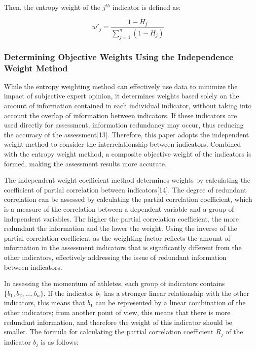 \documentclass[12pt]{article}  %
\begin{document}
Then, the entropy weight of the \(j^{th}\) indicator is defined as:

\begin{equation}
	w'_j=\frac{1-H_j}{\sum_{j=1}^n(1-H_j)}
\end{equation}

\subsubsection{Determining Objective Weights Using the Independence Weight Method}

While the entropy weighting method can effectively use data to minimize the impact of subjective expert opinion, it determines weights based solely on the amount of information contained in each individual indicator, without taking into account the overlap of information between indicators. If these indicators are used directly for assessment, information redundancy may occur, thus reducing the accuracy of the assessment[13]. Therefore, this paper adopts the independent weight method to consider the interrelationship between indicators. Combined with the entropy weight method, a composite objective weight of the indicators is formed, making the assessment results more accurate.

The independent weight coefficient method determines weights by calculating the coefficient of partial correlation between indicators[14]. The degree of redundant correlation can be assessed by calculating the partial correlation coefficient, which is a measure of the correlation between a dependent variable and a group of independent variables. The higher the partial correlation coefficient, the more redundant the information and the lower the weight. Using the inverse of the partial correlation coefficient as the weighting factor reflects the amount of information in the assessment indicators that is significantly different from the other indicators, effectively addressing the issue of redundant information between indicators.

In assessing the momentum of athletes, each group of indicators contains \(\{b_1, b_2, \ldots, b_n\}\). If the indicator \(b_1\) has a stronger linear relationship with the other indicators, this means that \(b_1\) can be represented by a linear combination of the other indicators; from another point of view, this means that there is more redundant information, and therefore the weight of this indicator should be smaller. The formula for calculating the partial correlation coefficient \(R_j\) of the indicator \(b_j\) is as follows:
\end{document}
